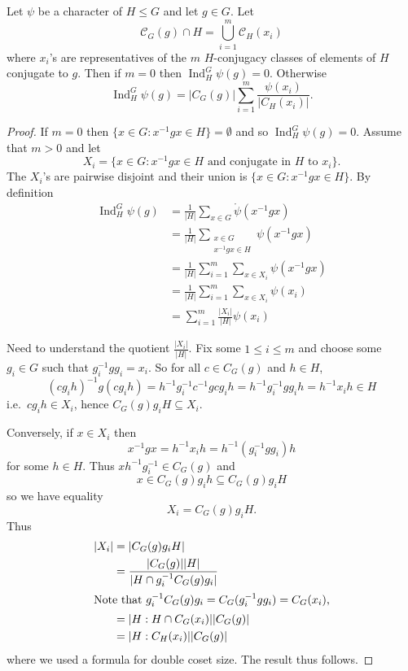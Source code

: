\documentclass[a4paper]{article}
\DeclareMathOperator{\Ind}{Ind} %
\theoremstyle{definition}
\begin{document}
\begin{proposition}
  Let \(\psi\) be a character of \(H \leq G\) and let \(g \in G\). Let
  \[
    \mathcal C_G(g) \cap H = \bigcup_{i = 1}^m \mathcal C_H(x_i)
  \]
  where \(x_i\)'s are representatives of the \(m\) \(H\)-conjugacy classes of elements of \(H\) conjugate to \(g\). Then if \(m = 0\) then \(\Ind_H^G \psi(g) = 0\). Otherwise
  \[
    \Ind_H^G \psi(g) = |C_G(g)| \sum_{i = 1}^m \frac{\psi(x_i)}{|C_H(x_i)|}.
  \]
\end{proposition}

\begin{proof}
  If \(m = 0\) then \(\{x \in G: x^{-1} g x \in H\} = \emptyset\)  and so \(\Ind_H^G \psi(g) = 0\). Assume that \(m > 0\) and let
  \[
    X_i = \{x \in G: x^{-1} g x \in H \text{ and conjugate in \(H\) to \(x_i\)}\}.
  \]
  The \(X_i\)'s are pairwise disjoint and their union is \(\{x \in G: x^{-1} g x \in H\}\). By definition
  \begin{align*}
    \Ind_H^G \psi(g)
    &= \frac{1}{|H|} \sum_{x \in G} \ocirc \psi(x^{-1} g x) \\
    &= \frac{1}{|H|} \sum_{\substack{x \in G \\ x^{-1} g x \in H}} \psi(x^{-1} gx) \\
    &= \frac{1}{|H|} \sum_{i = 1}^m \sum_{x \in X_i} \psi(x^{-1} g x) \\
    &= \frac{1}{|H|} \sum_{i = 1}^m \sum_{x \in X_i} \psi(x_i) \\
    &= \sum_{i = 1}^m \frac{|X_i|}{|H|} \psi(x_i)
  \end{align*}

  Need to understand the quotient \(\frac{|X_i|}{|H|}\). Fix some \(1 \leq i \leq m\) and choose some \(g_i \in G\) such that \(g_i^{-1} g g_i = x_i\). So for all \(c \in C_G(g)\) and \(h \in H\),
  \[
    (cg_ih)^{-1} g (cg_ih)
    = h^{-1} g_i^{-1} c^{-1} g c g_i h
    = h^{-1} g_i^{-1} g g_i h
    = h^{-1} x_i h
    \in H
  \]
  i.e.\ \(cg_ih \in X_i\), hence \(C_G(g) g_i H \subseteq X_i\).

  Conversely, if \(x \in X_i\) then
  \[
    x^{-1} g x
    = h^{-1} x_i h 
    = h^{-1} (g_i^{-1} g g_i) h
  \]
  for some \(h \in H\). Thus \(x h^{-1} g_i^{-1} \in C_G(g)\) and
  \[
    x \in C_G(g) g_i h \subseteq C_G(g) g_i H
  \]
  so we have equality
  \[
    X_i = C_G(g) g_i H.
  \]
  Thus
  \begin{align*}
    |X_i|
    &= |C_G(g) g_i H| \\
    &= \frac{|C_G(g)| |H|}{|H \cap g_i^{-1} C_G(g) g_i|} \\
    \intertext{Note that \(g_i^{-1} C_G(g) g_i = C_G(g_i^{-1} g g_i) = C_G(x_i)\),}
    &= |H: H \cap C_G(x_i)| |C_G(g)| \\
    &= |H: C_H(x_i)| |C_G(g)|
  \end{align*}
  where we used a formula for double coset size. The result thus follows.
\end{proof}
\end{document}
